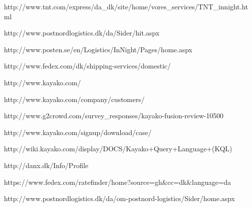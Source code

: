 \begin{thebibliography}{9}
	http://www.tnt.com/express/da\_dk/site/home/vores\_services/TNT\_innight.html

	http://www.postnordlogistics.dk/da/Sider/hit.aspx

	http://www.posten.se/en/Logistics/InNight/Pages/home.aspx

	http://www.fedex.com/dk/shipping-services/domestic/

	http://www.kayako.com/

	http://www.kayako.com/company/customers/

	http://www.g2crowd.com/survey\_responses/kayako-fusion-review-10500

	http://www.kayako.com/signup/download/case/

	http://wiki.kayako.com/display/DOCS/Kayako+Query+Language+(KQL)

	http://danx.dk/Info/Profile

	https://www.fedex.com/ratefinder/home?source=gh\&cc=dk\&language=da

	http://www.postnordlogistics.dk/da/om-postnord-logistics/Sider/home.aspx


\end{thebibliography}
